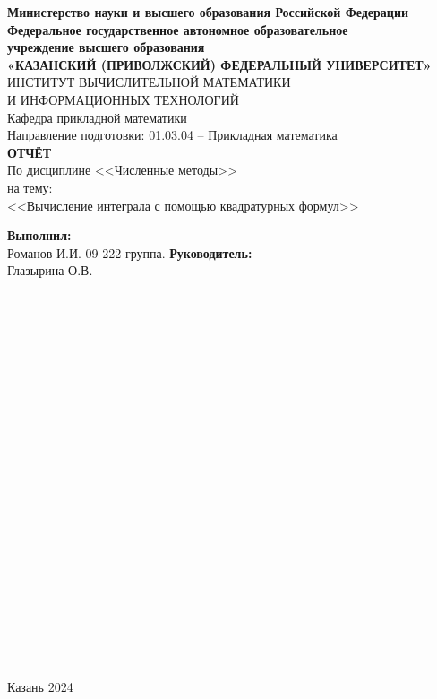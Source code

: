 \documentclass[14pt]{article}
\begin{document}
\begin{center}
\hfill \break
\textbf{\large{Министерство науки и высшего образования Российской Федерации\\
Федеральное государственное автономное образовательное\\
учреждение высшего образования}}
\\
\large{\textbf{«КАЗАНСКИЙ (ПРИВОЛЖСКИЙ) ФЕДЕРАЛЬНЫЙ УНИВЕРСИТЕТ»}}\\
\hfill \break
\large{ИНСТИТУТ ВЫЧИСЛИТЕЛЬНОЙ МАТЕМАТИКИ\\ И ИНФОРМАЦИОННЫХ ТЕХНОЛОГИЙ}\\
 \hfill \break
\large{Кафедра прикладной математики}\\
\hfill\break
\hfill \break
\large{Направление подготовки: 01.03.04 – Прикладная математика}\\
\hfill \break
\hfill \break
\textbf{\large{ОТЧЁТ}}\\
\large{По дисциплине <<Численные методы>>}\\
\large{на тему:}\\
\large{<<Вычисление интеграла с помощью квадратурных формул>>}\\
\hfill \break
\hfill \break
\end{center}

\hfill \break
\large{\textbf{Выполнил:}\\Романов И.И. 09-222 группа.}
\hfill \break
\hfill \break
\large{\textbf{Руководитель:}\\Глазырина О.В.}
\\
\\
\\
\\
\\
\\
\\
\\
\\
\\
\\
\\
\\
\\
\\
\\
\\
\\
\\
\\
\\
\\
\\
\begin{center} Казань 2024 \end{center}
\thispagestyle{empty}
 
\end{document}
